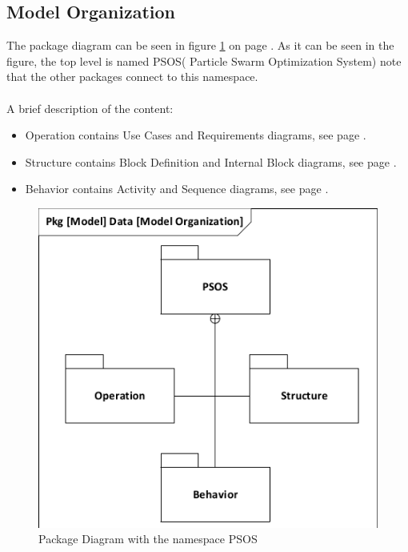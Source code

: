 \subsection{Model Organization}
The package diagram can be seen in figure \ref{fig:pkg} on page \pageref{fig:pkg}. As it can be seen in the figure, the top level is named PSOS( Particle Swarm Optimization System) note that the other packages connect to this namespace.
\\\\
A brief description of the content:
\begin{itemize}
	\item Operation contains Use Cases and Requirements diagrams, see page \pageref{requirementspecification:usecasediagrams}.
	\item Structure contains Block Definition and Internal Block diagrams, see page \pageref{requirementspecification:Structure}.
	\item Behavior contains Activity and Sequence diagrams, see page \pageref{requirementspecification:Behavior}.

\end{itemize}

\begin{figure}[!h]
	\centering
	\includegraphics[width=0.7\linewidth]{diagram/pkg_data_model_organization.pdf}
	\caption{Package Diagram with the namespace PSOS}
	\label{fig:pkg}
\end{figure}